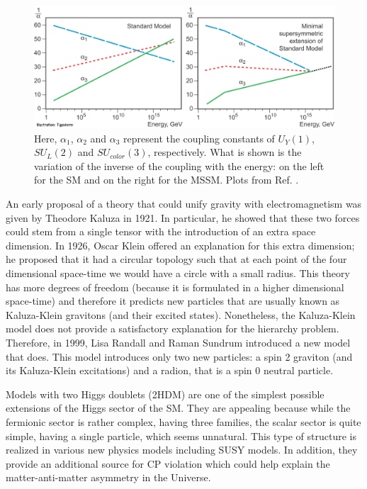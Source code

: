 \begin{figure}
	\includegraphics[width=\textwidth]{Figures/SM_MSSM.jpg}
	\caption{Here, $\alpha_1$, $\alpha_2$ and $\alpha_3$ represent the coupling constants of $U_Y(1)$, $SU_L(2)$ and $SU_{color}(3)$, respectively. What is shown is the variation of the inverse of the coupling with the energy: on the left for the SM and on the right for the MSSM. Plots from Ref. \cite{running_coupling}.}
	\label{fig:SM_MSSM}
\end{figure}

An early proposal of a theory that could unify gravity with electromagnetism was given by Theodore Kaluza in 1921. In particular, he showed that these two forces could stem from a single tensor with the introduction of an extra space dimension. In 1926, Oscar Klein offered an explanation for this extra dimension; he proposed that it had a circular topology such that at each point of the four dimensional space-time we would have a circle with a small radius. This theory has more degrees of freedom (because it is formulated in a higher dimensional space-time) and therefore it predicts new particles that are usually known as Kaluza-Klein gravitons (and their excited states). Nonetheless, the Kaluza-Klein model does not provide a satisfactory explanation for the hierarchy problem. Therefore, in 1999, Lisa Randall and Raman Sundrum introduced a new model that does. This model introduces only two new particles: a spin 2 graviton (and its Kaluza-Klein excitations) and a radion, that is a spin 0 neutral particle.

Models with two Higgs doublets (2HDM) are one of the simplest possible extensions of the Higgs sector of the SM. They are appealing because while the fermionic sector is rather complex, having three families, the scalar sector is quite simple, having a single particle, which seems unnatural. This type of structure is realized in various new physics models including SUSY models. In addition, they provide an additional source for CP violation which could help explain the matter-anti-matter asymmetry in the Universe. 

